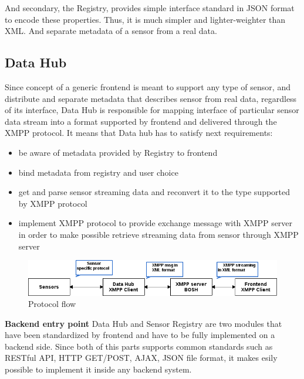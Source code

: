     And secondary, the Registry, provides simple interface standard in JSON format to encode these properties. Thus, it is much simpler and lighter-weighter than XML. And separate metadata of a sensor from a real data. 

	\subsection{Data Hub}
    Since concept of a generic frontend is meant to support any type of sensor, and distribute and separate metadata that describes sensor from real data, regardless of its interface, Data Hub is responsible for mapping interface of particular sensor data stream into a format supported by frontend and delivered through the XMPP protocol. It means that Data hub has to satisfy next requirements:

    \begin{itemize}
    \item be aware of metadata provided by Registry to frontend
    \item bind metadata from registry and user choice
    \item get and parse sensor streaming data and reconvert it to the type supported by XMPP protocol
    \item implement XMPP protocol to provide exchange message with XMPP server in order to make possible retrieve streaming data from sensor through XMPP server

    \end{itemize}
      \begin{figure}[!ht]
      \centering
      \includegraphics[scale=0.6]{images/Protocol_flow.png}   
      \caption[Protocol flow]{Protocol flow}
      \label{img:protocol}                           
      \end{figure}
    
    \textbf{Backend entry point}
    Data Hub and Sensor Registry are two modules that have been standardized by frontend and have to be fully implemented on a backend side. Since both of this parts supports common standards such as RESTful API, HTTP GET/POST, AJAX, JSON file format, it makes esily possible to implement it inside any backend system.
      
